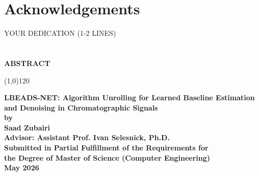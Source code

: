 \documentclass[12pt,draft,letterpaper]{report}
\newcommand{\thesistitle}{LBEADS-NET: Algorithm Unrolling for Learned Baseline Estimation and Denoising in Chromatographic Signals}
\newcommand{\thesisauthor}{Saad Zubairi}
\newcommand{\thesisadvisor}{Ivan Selesnick}
\newcommand{\graddate}{May 2026} %
\newcommand{\thesisdedication}{YOUR DEDICATION (1-2 LINES)} %
\begin{document}
\section*{Acknowledgements}

\newpage

\vspace*{\fill}
\begin{center}
  \thesisdedication%
\end{center}
\vfill
\newpage


\section*{}
\begin{center}
{\bfseries 
  {\bf ABSTRACT}\\
\begin{center}
\line(1,0){120}
\end{center}  
\vspace{.25in}  
  {\bf \thesistitle}\\  
  {\bf by}\\  
  {\bf \thesisauthor}\\
  {\bf Advisor: Assistant Prof. \thesisadvisor, Ph.D.}\\
  {\bf Submitted in Partial Fulfillment of the Requirements for}\\
  {\bf the Degree of Master of Science (Computer Engineering) }\\
  \vspace{.25in}
  {\bf \graddate}  
  \vspace{.25in}
}
\end{center}

\newpage

\tableofcontents

\listoffigures{}
\newpage

\listoftables{}
\newpage
\end{document}
